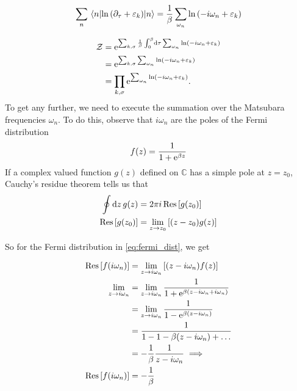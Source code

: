\begin{equation}
\sum_n\ev{\ln\left(\partial_\tau + \varepsilon_k\right)}{n} = \frac{1}{\beta}\sum_{\omega_n}\ln\left(-i\omega_n + \varepsilon_k\right)
\end{equation}

\begin{align}
\label{eq:partition_free_electron}
\begin{split}
\mathcal{Z} &= \mathrm{e}^{\sum_{k,\sigma}\frac{1}{\beta}\int_0^\beta\dd{\tau}\sum_{\omega_n}\ln\left(-i\omega_n + \varepsilon_k\right)} \\
&= \mathrm{e}^{\sum_{k,\sigma}\sum_{\omega_n}\ln\left(-i\omega_n + \varepsilon_k\right)} \\
&= \prod_{k,\sigma}\mathrm{e}^{\sum_{\omega_n}\ln\left(-i\omega_n + \varepsilon_k\right)}.
\end{split}
\end{align}
To get any further, we need to execute the summation over the Matsubara frequencies $\omega_n$. To do this, observe that $i\omega_n$ are the poles of the Fermi distribution
\begin{equation}
\label{eq:fermi_dist}
f(z) = \frac{1}{1+\mathrm{e}^{\beta z}}
\end{equation}
If a complex valued function $g(z)$ defined on $\mathbb{C}$ has a simple pole at $z = z_0$, Cauchy's residue theorem tells us that 
\begin{align}
\oint\dd{z}g(z) &= 2\pi i\Res\left[g(z_0)\right] \\
\Res\left[g(z_0)\right]&= \lim_{z\rightarrow z_0}\left[(z-z_0)g(z)\right]
\end{align}

So for the Fermi distribution in \eqref{eq:fermi_dist}, we get

\begin{align}
\Res\left[f(i\omega_n)\right] &= \lim_{z\rightarrow i\omega_n}\left[(z-i\omega_n)f(z)\right] \nonumber \\
\lim_{z\rightarrow i\omega_n} &= \lim_{z\rightarrow i\omega_n}\frac{1}{1+\e^{\beta(z-i\omega_n + i\omega_n)}} \nonumber \\
&= \lim_{z\rightarrow i\omega_n} \frac{1}{1-\e^{\beta(z-i\omega_n)}} \nonumber \\
&= \frac{1}{1-1-\beta(z-i\omega_n)+\dots} \nonumber \\
&= -\frac{1}{\beta}\frac{1}{z-i\omega_n} \implies \nonumber \\
\Res\left[f(i\omega_n)\right] &= -\frac{1}{\beta}
\end{align}

